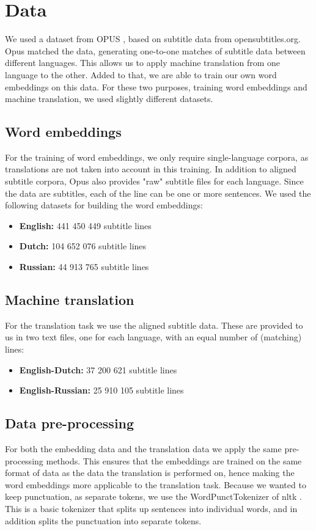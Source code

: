 \documentclass{article}
\begin{document}
\section*{Data}
We used a dataset from OPUS \cite{opus2018}, based on subtitle data from opensubtitles.org. Opus matched the data, generating one-to-one matches of subtitle data between different languages. This allows us to apply machine translation from one language to the other. Added to that, we are able to train our own word embeddings on this data. For these two purposes, training word embeddings and machine translation, we used slightly different datasets.

\subsection*{Word embeddings}
For the training of word embeddings, we only require single-language corpora, as translations are not taken into account in this training. In addition to aligned subtitle corpora, Opus \cite{opus2018} also provides "raw" subtitle files for each language. Since the data are subtitles, each of the line can be one or more sentences. We used the following datasets for building the word embeddings:

\begin{itemize}
    \item \textbf{English:} 441 450 449 subtitle lines
    \item \textbf{Dutch:} 104 652 076 subtitle lines
    \item \textbf{Russian:} 44 913 765 subtitle lines
\end{itemize}

\subsection*{Machine translation}
For the translation task we use the aligned subtitle data. These are provided to us in two text files, one for each language, with an equal number of (matching) lines:

\begin{itemize}
    \item \textbf{English-Dutch:} 37 200 621 subtitle lines
    \item \textbf{English-Russian:} 25 910 105 subtitle lines
\end{itemize}

\subsection*{Data pre-processing}
For both the embedding data and the translation data we apply the same pre-processing methods. This ensures that the embeddings are trained on the same format of data as the data the translation is performed on, hence making the word embeddings more applicable to the translation task. Because we wanted to keep punctuation, as separate tokens, we use the WordPunctTokenizer of nltk \cite{Loper02nltk:the}. This is a basic tokenizer that splits up sentences into individual words, and in addition splits the punctuation into separate tokens.
\end{document}
